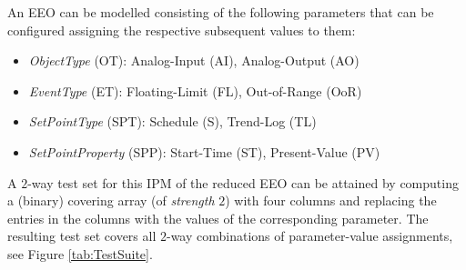 \documentclass[runningheads]{llncs}
\begin{document}
An EEO can be modelled consisting of the following parameters that can
be configured assigning the respective subsequent values to them:
\begin{itemize}
    \item \textit{ObjectType} (OT): Analog-Input (AI), Analog-Output (AO)
    \item \textit{EventType} (ET): Floating-Limit (FL), Out-of-Range (OoR)
    \item \textit{SetPointType} (SPT): Schedule (S), Trend-Log (TL)
    \item \textit{SetPointProperty} (SPP): Start-Time (ST), Present-Value (PV)
\end{itemize}




A $2$-way test set for this IPM of the reduced EEO can be attained by computing a (binary)
covering array (of \emph{strength} $2$) with four columns and replacing the entries in the columns
with the values of the corresponding parameter.
The resulting test set covers all $2$-way combinations of parameter-value assignments, see Figure \ref{tab:TestSuite}.


\end{document}
